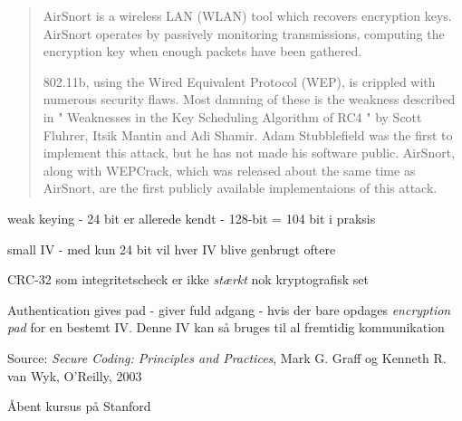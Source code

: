 \documentclass[Screen16to9,17pt]{foils}
\begin{document}




\begin{quote}
AirSnort is a wireless LAN (WLAN) tool which recovers encryption
keys. AirSnort operates by passively monitoring transmissions,
computing the encryption key when enough packets have been gathered.

802.11b, using the Wired Equivalent Protocol (WEP), is crippled with
numerous security flaws. Most damning of these is the weakness
described in " Weaknesses in the Key Scheduling Algorithm of RC4 "
by Scott Fluhrer, Itsik Mantin and Adi Shamir. Adam Stubblefield
was the first to implement this attack, but he has not made his
software public. AirSnort, along with WEPCrack, which was released
about the same time as AirSnort, are the first publicly available
implementaions of this attack.  
\end{quote}



\begin{list1}
\item weak keying - 24 bit er allerede kendt - 128-bit = 104 bit i praksis
\item small IV - med kun 24 bit vil hver IV blive genbrugt oftere
\item CRC-32 som integritetscheck er ikke \emph{stærkt} nok
  kryptografisk set
\item Authentication gives pad - giver fuld adgang - hvis der bare
  opdages \emph{encryption pad} for en bestemt IV. Denne IV kan så
  bruges til al fremtidig kommunikation
\end{list1}
Source:
\emph{Secure Coding: Principles and Practices}, Mark G. Graff
  og Kenneth R. van Wyk, O'Reilly, 2003



Åbent kursus på Stanford\\
\end{document}
